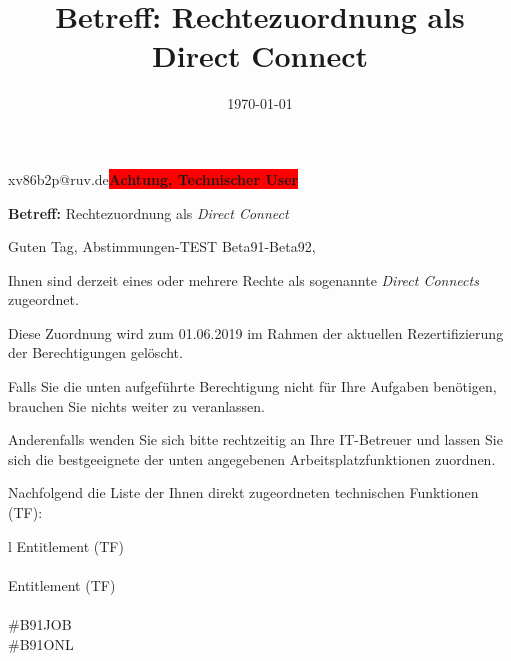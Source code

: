 \documentclass[a4paper,landscape,12pt]{letter}
\title{\textbf{Betreff:} Rechtezuordnung als Direct Connect}
\date{\today}
\begin{document}
	\pagestyle{headings}
	
	
\begin{letter}{xv86b2p@ruv.de\space\space\space\space\space\space\space\space\space\bfseries\colorbox{red}{Achtung, Technischer User}\hfill \break}
\begin{normalsize}
	\opening{\textbf{Betreff:} Rechtezuordnung als \emph{Direct Connect}}
	\begin{normalsize} \hfill
	\end{normalsize}

	\begin{normalsize}
		Guten Tag, 
	Abstimmungen-TEST Beta91-Beta92, \hfill \break
	\end{normalsize}
	\end{normalsize}
	
\begin{normalsize}
	Ihnen sind derzeit eines oder mehrere Rechte als sogenannte \emph{Direct Connects} zugeordnet.
	
	Diese Zuordnung wird zum 01.06.2019 im Rahmen der aktuellen Rezertifizierung der Berechtigungen gelöscht.
	
	Falls Sie die unten aufgeführte Berechtigung nicht für Ihre Aufgaben benötigen, 
	brauchen Sie nichts weiter zu veranlassen.
	
	Anderenfalls wenden Sie sich bitte rechtzeitig an Ihre IT-Betreuer 
	und lassen Sie sich die bestgeeignete der unten angegebenen Arbeitsplatzfunktionen zuordnen.
	\end{normalsize}
	
\begin{normalsize}
	Nachfolgend die Liste der Ihnen direkt zugeordneten technischen Funktionen (TF):

	\begin{longtable}{l}
		Entitlement (TF) \\ \hline
		\endfirsthead
		\\\hline
		Entitlement (TF) \\ \hline
		\endhead %
		\multicolumn{1}{r@{}}{Fortsetzung \ldots}\\
		\endfoot
		\hline
		\endlastfoot
	\#B91JOB\\\#B91ONL\\
	\end{longtable}
	\end{normalsize}
	

\end{letter}
\end{document}
